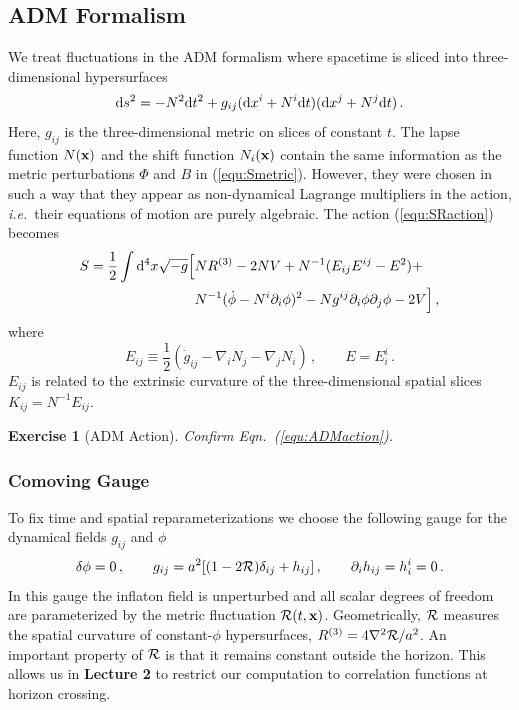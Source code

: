\documentclass[12pt,letterpaper,rotate]{article}
\def\beq{\begin{equation}}
\def\eeq{\end{equation}}
\def\d{{\rm d}}
\def\R{{\cal R}}
\newtheorem{thm}{Exercise}
\begin{document}
{\subsection{ADM Formalism}
We treat fluctuations in the ADM formalism \cite{ADM} where spacetime is sliced into three-dimensional hypersurfaces
\beq
\d s^2 = - N^2 \d t^2 + g_{ij} (\d x^i + N^i \d t) (\d x^j + N^j \d t)\, .
\eeq
Here, $g_{ij}$ is the three-dimensional metric on slices of constant $t$.
The lapse function $N({\bf x})$ and the shift function $N_i({\bf x})$ contain the same information as the metric perturbations $\Phi$ and $B$ in (\ref{equ:Smetric}). However, they were chosen in such a way that they appear as non-dynamical Lagrange multipliers in the action, {\it i.e.}~their equations of motion are purely algebraic. The action (\ref{equ:SRaction}) becomes
\begin{align}
\label{equ:ADMaction}
S = \frac{1}{2} \int \d^4 x \sqrt{-g} \Bigl[ & N R^{(3)} - 2 N V + N^{-1} (E_{ij} E^{ij} -E^2) + \nonumber \\
&  N^{-1} (\dot \phi - N^i \partial_i \phi)^2 - N g^{ij} \partial_i \phi \partial_j \phi - 2 V \Bigr]\, ,
\end{align}
where
\beq
E_{ij} \equiv \frac{1}{2} (\dot g_{ij} - \nabla_i N_j - \nabla_j N_i)\, , \qquad E = E^{i}_i\, .
\eeq
$E_{ij}$
is related to the extrinsic curvature of the three-dimensional spatial slices $K_{ij} = N^{-1} E_{ij}$.

\begin{thm}[ADM Action]
 Confirm Eqn.~(\ref{equ:ADMaction}).  \end{thm}

\subsubsection{Comoving Gauge}
To fix time and spatial reparameterizations we choose the following gauge for the dynamical fields $g_{ij}$ and $\phi$ 
\beq
\delta \phi = 0\, , \qquad g_{ij} = a^2 [(1- 2 \R) \delta_{ij} + h_{ij}]\, , \qquad \partial_i h_{ij} = h^i_{i} = 0\, .
\eeq
In this gauge the inflaton field is unperturbed and all scalar degrees of freedom are parameterized by the metric fluctuation $\R(t, {\bf x})$.  Geometrically, $\R$ measures the spatial curvature of constant-$\phi$ hypersurfaces, $R^{(3)} =  4 \nabla^2 \R/a^2$. An important property of $\R$ is that it remains constant outside the horizon.  This allows us in {\bf Lecture 2} to restrict our computation to correlation functions at horizon crossing.

}
\end{document}
